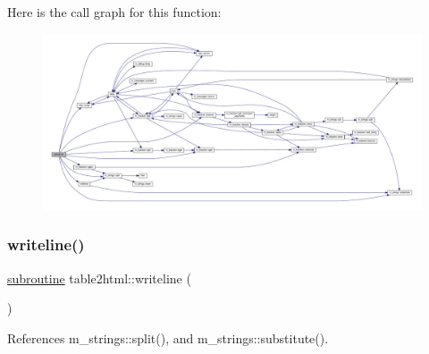 Here is the call graph for this function\+:
\nopagebreak
\begin{figure}[H]
\begin{center}
\leavevmode
\includegraphics[width=350pt]{table2html_8f90_ac9fa6313f884ee5cf8caf9b9bfb9f3cd_cgraph}
\end{center}
\end{figure}
\mbox{\label{table2html_8f90_a8fd5b1ad7c5297852591499ca1e2db09}} 
\subsubsection{\texorpdfstring{writeline()}{writeline()}}
{\footnotesize\ttfamily \hyperlink{M__stopwatch_83_8txt_acfbcff50169d691ff02d4a123ed70482}{subroutine} table2html\+::writeline (\begin{DoxyParamCaption}{ }\end{DoxyParamCaption})}



References m\+\_\+strings\+::split(), and m\+\_\+strings\+::substitute().


